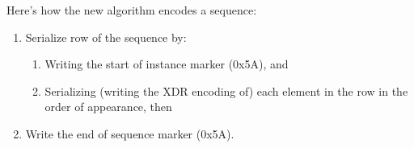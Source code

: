 Here's how the new algorithm encodes a sequence:

\begin{enumerate}

\item Serialize row of the sequence by: 

\begin{enumerate}
\item Writing the start of instance marker (0x5A), and 
\item Serializing (writing the XDR encoding of) each element in the
  row in the order of appearance, then
\end{enumerate}
\item Write the end of sequence marker (0x5A).
\end{enumerate}












